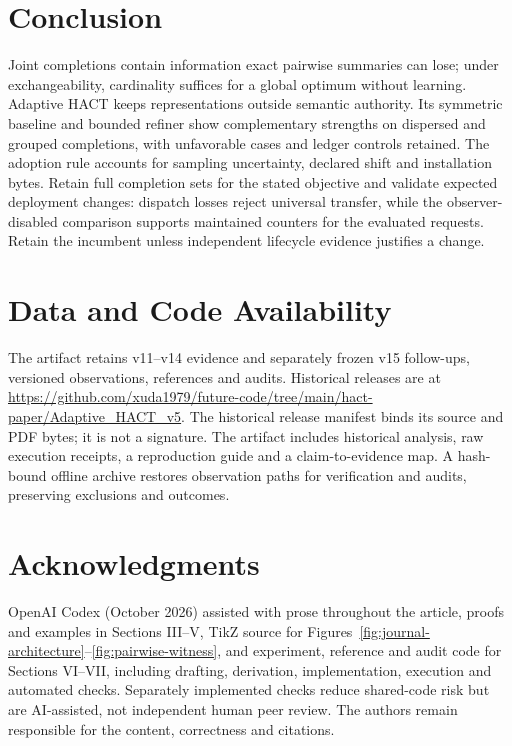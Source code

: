 \documentclass[10pt,journal,compsoc]{IEEEtran}
\theoremstyle{definition}\newtheorem{definition}[theorem]{Definition}
\begin{document}
\section{Conclusion}
Joint completions contain information exact pairwise summaries can lose;
under exchangeability, cardinality suffices for a global optimum without
learning. Adaptive HACT keeps representations outside semantic authority.
Its symmetric baseline and bounded refiner show complementary strengths on
dispersed and grouped completions, with unfavorable cases and ledger controls
retained. The adoption rule accounts for sampling uncertainty, declared
shift and installation bytes. Retain full completion sets for the stated
objective and validate expected deployment changes: dispatch losses reject
universal transfer, while the observer-disabled comparison supports maintained
counters for the evaluated requests. Retain the incumbent unless independent
lifecycle evidence justifies a change.

\section*{Data and Code Availability}
The artifact retains v11--v14 evidence and separately frozen v15 follow-ups,
versioned observations, references and audits. Historical releases are at
\url{https://github.com/xuda1979/future-code/tree/main/hact-paper/Adaptive_HACT_v5}.
The historical release manifest binds its source and PDF bytes; it is not a
signature. The artifact includes historical analysis, raw execution receipts,
a reproduction guide and a claim-to-evidence map. A hash-bound offline archive
restores observation paths for verification and audits, preserving exclusions
and outcomes.
\section*{Acknowledgments}
OpenAI Codex (October 2026) assisted with prose throughout the article,
proofs and examples in Sections III--V, TikZ source for Figures~\ref{fig:journal-architecture}--\ref{fig:pairwise-witness},
and experiment, reference and audit code for Sections VI--VII, including
drafting, derivation, implementation, execution and automated checks.
Separately implemented checks reduce shared-code risk but are AI-assisted,
not independent human peer review. The authors remain responsible for the
content, correctness and citations.
\end{document}

